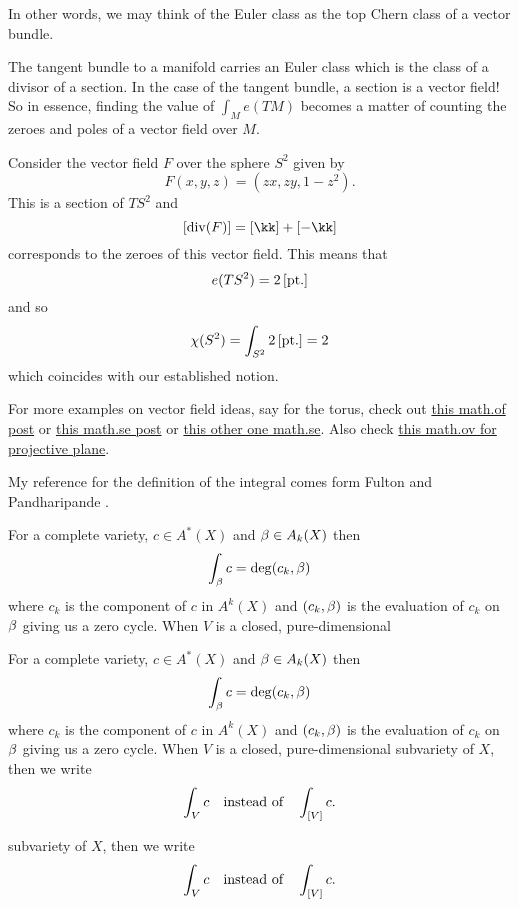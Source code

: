 \documentclass[12pt]{memoir}
\begin{document}
\begin{Rmk}
In other words, we may think of the Euler class as the top Chern class of a vector bundle.
\end{Rmk}

\begin{Ex}
    The tangent bundle to a manifold carries an Euler class which is the class of a divisor of a section. In the case of the tangent bundle, a section is a vector field! So in essence, finding the value of $\int_Me(TM)$ becomes a matter of counting the zeroes and poles of a vector field over $M$.
\end{Ex}

\begin{Ex}
    Consider the vector field $F$ over the sphere $S^2$ given by 
    $$F(x,y,z)=(zx,zy,1-z^2).$$
    This is a section of $TS^2$ and 
    $$\bonj{\div(F)}=\bonj{\kk}+\bonj{-\kk}$$
    corresponds to the zeroes of this vector field. This means that 
    $$e(TS^2)=2\left\lbrack\text{pt.}\right\rbrack$$
    and so 
    $$\chi(S^2)=\int_{S^2}2\left\lbrack\text{pt.}\right\rbrack=2$$
    which coincides with our established notion.
\end{Ex}

\begin{Rmk}
    For more examples on vector field ideas, say for the torus, check out \href{https://mathoverflow.net/questions/153961/constructing-a-vector-field-with-given-zeros-on-a-torus}{this math.of post} or \href{https://math.stackexchange.com/questions/213901/vector-fields-on-torus}{this math.se post} or \href{https://math.stackexchange.com/questions/3604214/non-vanishing-vector-fields-on-the-2-torus}{this other one math.se}. Also check \href{https://mathoverflow.net/questions/97449/computing-the-euler-characteristic-of-the-complex-projective-plane-using-differe}{this math.ov for projective plane}.
\end{Rmk}

My reference for the definition of the integral comes form Fulton and Pandharipande \cite{FPNotes}.

\begin{Def}
    For a complete variety, $c\in A^\ast(X)$ and $\beta\in A_k(X)$ then 
    $$\int_\beta c=\deg(c_k,\beta)$$
    where $c_k$ is the component of $c$ in $A^k(X)$ and $(c_k,\beta)$ is the evaluation of $c_k$ on $\beta$ giving us a zero cycle. When $V$ is a closed, pure-dimensional \begin{Def}
        For a complete  variety, $c\in A^\ast(X)$ and $\beta\in A_k(X)$ then 
        $$\int_\beta c=\deg(c_k,\beta)$$
        where $c_k$ is the component of $c$ in $A^k(X)$ and $(c_k,\beta)$ is the evaluation of $c_k$ on $\beta$ giving us a zero cycle. When $V$ is a closed, pure-dimensional  subvariety of $X$, then we write 
        $$\int_V c\quad\text{instead of}\quad\int_{\left\lbrack V\right\rbrack}c.$$
    \end{Def}subvariety of $X$, then we write 
    $$\int_V c\quad\text{instead of}\quad\int_{\left\lbrack V\right\rbrack}c.$$
\end{Def}
\end{document}
